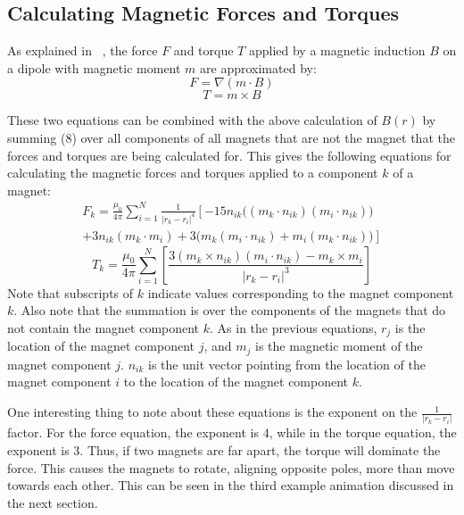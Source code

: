 \documentclass[tog]{acmsiggraph}
\begin{document}
\subsection{Calculating Magnetic Forces and Torques}

As explained in ~\cite{Thomaszewski:2008:MIM}, the force $F$ and torque $T$ applied by a magnetic induction $B$ on a dipole with magnetic moment $m$ are approximated by:
\begin{equation}
F = \nabla(m \cdot B)
\end{equation}
\begin{equation}
T = m \times B
\end{equation}

These two equations can be combined with the above calculation of $B(r)$ by summing (8) over all components of all magnets that are not the magnet that the forces and torques are being calculated for. This gives the following equations for calculating the magnetic forces and torques applied to a component $k$ of a magnet:
\begin{equation}
\begin{split}
F_k = \frac{\mu_0}{4\pi}\sum_{i=1}^N \frac{1}{\left|r_k - r_i\right|^4}\left[-15n_{ik}\bigl((m_k \cdot n_{ik})(m_i \cdot n_{ik})\bigr) \right. \\
\left. + 3n_{ik}(m_k \cdot m_i) + 3\bigl(m_k(m_i \cdot n_{ik}) + m_i(m_k \cdot n_{ik})\bigr)\right]
\end{split}
\end{equation}
\begin{equation}
T_k = \frac{\mu_0}{4\pi}\sum_{i=1}^N \left[ \frac{3(m_k \times n_{ik})(m_i \cdot n_{ik}) - m_k \times m_i}{\left| r_k - r_i \right|^3} \right]
\end{equation}
Note that subscripts of $k$ indicate values corresponding to the magnet component $k$. Also note that the summation is over the components of the magnets that do not contain the magnet component $k$. As in the previous equations, $r_j$ is the location of the magnet component $j$, and $m_j$ is the magnetic moment of the magnet component $j$. $n_{ik}$ is the unit vector pointing from the location of the magnet component $i$ to the location of the magnet component $k$.

One interesting thing to note about these equations is the exponent on the $\frac{1}{\left|r_k - r_i\right|}$ factor. For the force equation, the exponent is $4$, while in the torque equation, the exponent is $3$. Thus, if two magnets are far apart, the torque will dominate the force. This causes the magnets to rotate, aligning opposite poles, more than move towards each other. This can be seen in the third example animation discussed in the next section.
\end{document}

